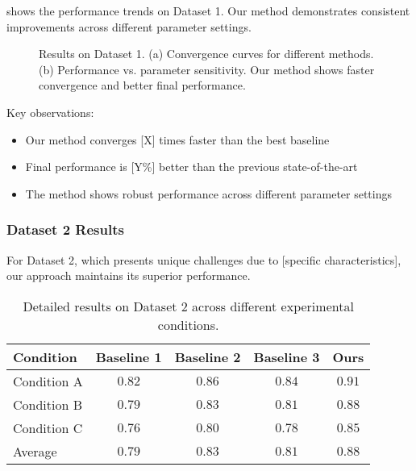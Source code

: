  shows the performance trends on Dataset 1. Our method demonstrates consistent improvements across different parameter settings.

\begin{figure}[htbp]
\centering
\caption{Results on Dataset 1. (a) Convergence curves for different methods. (b) Performance vs. parameter sensitivity. Our method shows faster convergence and better final performance.}
\label{fig:dataset1_results}
\end{figure}

Key observations:
\begin{itemize}
    \item Our method converges [X] times faster than the best baseline
    \item Final performance is [Y\%] better than the previous state-of-the-art
    \item The method shows robust performance across different parameter settings
\end{itemize}

\subsubsection{Dataset 2 Results}

For Dataset 2, which presents unique challenges due to [specific characteristics], our approach maintains its superior performance.

\begin{table}[htbp]
\centering
\caption{Detailed results on Dataset 2 across different experimental conditions.}
\label{tab:dataset2_results}
\begin{tabular}{lcccc}
\toprule
Condition & Baseline 1 & Baseline 2 & Baseline 3 & \textbf{Ours} \\
\midrule
Condition A & $0.82$ & $0.86$ & $0.84$ & $\mathbf{0.91}$ \\
Condition B & $0.79$ & $0.83$ & $0.81$ & $\mathbf{0.88}$ \\
Condition C & $0.76$ & $0.80$ & $0.78$ & $\mathbf{0.85}$ \\
\midrule
Average & $0.79$ & $0.83$ & $0.81$ & $\mathbf{0.88}$ \\
\bottomrule
\end{tabular}
\end{table}


